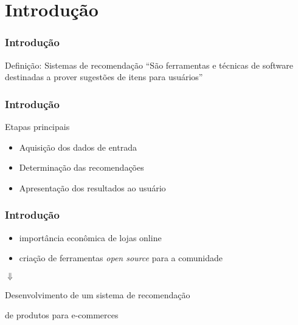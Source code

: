 \section[Introdução]{Introdução}
\begin{frame}
\frametitle{Introdução}
\begin{block}{Definição: Sistemas de recomendação}
``São ferramentas e técnicas de software destinadas a prover sugestões de itens para usuários'' \cite{ricci2011introduction-chap1}
\end{block}
\end{frame}


\begin{frame}
\frametitle{Introdução}
\begin{block}{Etapas principais}
\begin{itemize}
	\item Aquisição dos dados de entrada
	\item Determinação das recomendações
	\item Apresentação dos resultados ao usuário
\end{itemize}
\end{block}
\end{frame}

\begin{frame}
\frametitle{Introdução}
\begin{itemize}
	\item importância econômica de lojas online
	\item criação de ferramentas \textit{open source} para a comunidade
\end{itemize}

\begin{center}
$\Downarrow$ 
\end{center}

\begin{center}
Desenvolvimento de um sistema de recomendação \par{} de produtos para e-commerces
\end{center}

\end{frame}
